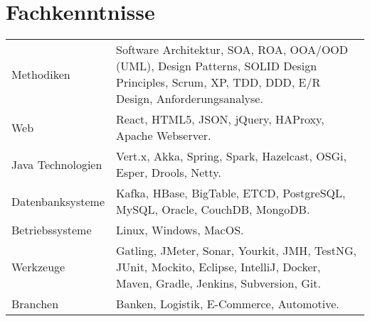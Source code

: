 \section*{Fachkenntnisse}
\begin{longtable}{@{}p{6cm}p{10cm}}
Methodiken	        & Software Architektur, SOA, ROA, OOA/OOD (UML), Design Patterns, SOLID Design Principles, Scrum, XP, TDD, DDD, E/R Design, Anforderungsanalyse.\\
Web         	    & React, HTML5, JSON, jQuery, HAProxy, Apache Webserver.\\
Java Technologien	& Vert.x, Akka, Spring, Spark, Hazelcast, OSGi, Esper, Drools, Netty.\\
Datenbanksysteme	& Kafka, HBase, BigTable, ETCD, PostgreSQL, MySQL, Oracle, CouchDB, MongoDB.\\
Betriebssysteme	    & Linux, Windows, MacOS.\\
Werkzeuge		    & Gatling, JMeter, Sonar, Yourkit, JMH, TestNG, JUnit, Mockito, Eclipse, IntelliJ, Docker, Maven, Gradle, Jenkins, Subversion, Git.\\
Branchen		    & Banken, Logistik, E-Commerce, Automotive.\\
\end{longtable}
